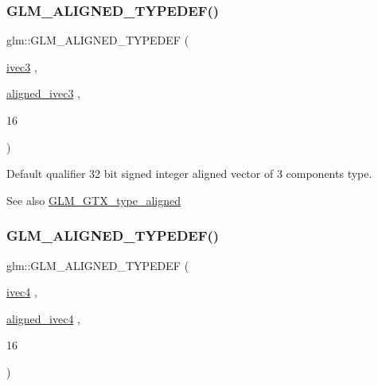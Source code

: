 \subsubsection{\texorpdfstring{G\+L\+M\+\_\+\+A\+L\+I\+G\+N\+E\+D\+\_\+\+T\+Y\+P\+E\+D\+E\+F()}{GLM\_ALIGNED\_TYPEDEF()}\hspace{0.1cm}{\footnotesize\ttfamily [51/209]}}
{\footnotesize\ttfamily glm\+::\+G\+L\+M\+\_\+\+A\+L\+I\+G\+N\+E\+D\+\_\+\+T\+Y\+P\+E\+D\+EF (\begin{DoxyParamCaption}\item[{\mbox{\hyperlink{group__core__types_ga6e12a4ca00d696f07da1df4eb73e0fe8}{ivec3}}}]{,  }\item[{\mbox{\hyperlink{group__gtc__type__aligned_gabbf85e492d39baef3a418c15c996ab65}{aligned\+\_\+ivec3}}}]{,  }\item[{16}]{ }\end{DoxyParamCaption})}

Default qualifier 32 bit signed integer aligned vector of 3 components type. \begin{DoxySeeAlso}{See also}
\mbox{\hyperlink{group__gtx__type__aligned}{G\+L\+M\+\_\+\+G\+T\+X\+\_\+type\+\_\+aligned}} 
\end{DoxySeeAlso}
\mbox{\label{group__gtx__type__aligned_ga50d8a9523968c77f8325b4c9bfbff41e}} 
\subsubsection{\texorpdfstring{G\+L\+M\+\_\+\+A\+L\+I\+G\+N\+E\+D\+\_\+\+T\+Y\+P\+E\+D\+E\+F()}{GLM\_ALIGNED\_TYPEDEF()}\hspace{0.1cm}{\footnotesize\ttfamily [52/209]}}
{\footnotesize\ttfamily glm\+::\+G\+L\+M\+\_\+\+A\+L\+I\+G\+N\+E\+D\+\_\+\+T\+Y\+P\+E\+D\+EF (\begin{DoxyParamCaption}\item[{\mbox{\hyperlink{group__core__types_gaa4560ddc50320ea8f8a70d5c9c249fea}{ivec4}}}]{,  }\item[{\mbox{\hyperlink{group__gtc__type__aligned_gaa33169a30c7d22a8648f20b4534f635f}{aligned\+\_\+ivec4}}}]{,  }\item[{16}]{ }\end{DoxyParamCaption})}

